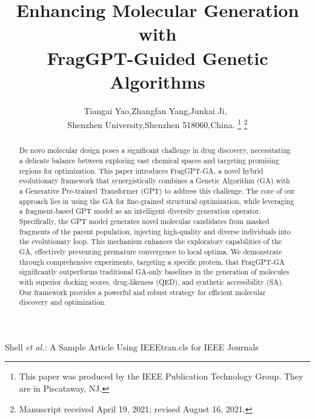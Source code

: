 \documentclass[lettersize,journal]{IEEEtran}
\begin{document}
\title{Enhancing Molecular Generation with\\FragGPT-Guided Genetic Algorithms}

\author{Tiangai Yao,Zhangfan Yang,Junkai Ji,~\\Shenzhen University,Shenzhen 518060,China.
\thanks{This paper was produced by the IEEE Publication Technology Group. They are in Piscataway, NJ.}%
\thanks{Manuscript received April 19, 2021; revised August 16, 2021.}}
%
{Shell \MakeLowercase{\textit{et al.}}: A Sample Article Using IEEEtran.cls for IEEE Journals}


\maketitle
\begin{abstract}
De novo molecular design poses a significant challenge in drug discovery, necessitating a delicate balance between exploring vast chemical spaces and targeting promising regions for optimization. This paper introduces FragGPT-GA, a novel hybrid evolutionary framework that synergistically combines a Genetic Algorithm (GA) with a Generative Pre-trained Transformer (GPT) to address this challenge. The core of our approach lies in using the GA for fine-grained structural optimization, while leveraging a fragment-based GPT model as an intelligent diversity generation operator. Specifically, the GPT model generates novel molecular candidates from masked fragments of the parent population, injecting high-quality and diverse individuals into the evolutionary loop. This mechanism enhances the exploratory capabilities of the GA, effectively preventing premature convergence to local optima. We demonstrate through comprehensive experiments, targeting a specific protein, that FragGPT-GA significantly outperforms traditional GA-only baselines in the generation of molecules with superior docking scores, drug-likeness (QED), and synthetic accessibility (SA). Our framework provides a powerful and robust strategy for efficient molecular discovery and optimization. 
\end{abstract}
\end{document}
